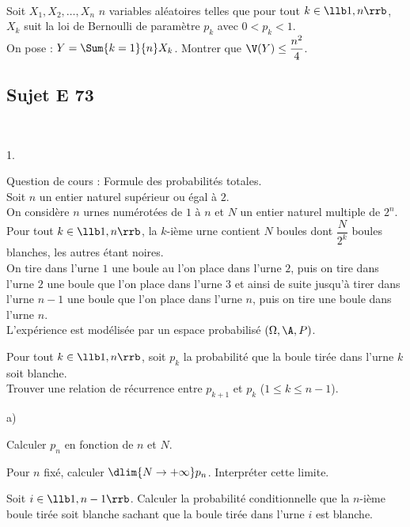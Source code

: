 \documentclass[11pt]{article}%
\begin{document}

\begin{exerciceSP}~\\
  Soit $X_1,X_2,\hdots,X_n$ $n$ variables aléatoires telles que pour
  tout $k\in\llb 1,n\rrb$, $X_k$ suit la loi de Bernoulli de paramètre
  $p_k$ avec $0 < p_k < 1$.\\
  On pose : $Y = \Sum{k=1}{n} X_k$. Montrer que $\V(Y)\leq
  \dfrac{n^2}{4}$.
\end{exerciceSP}


\newpage

\subsection*{Sujet E 73}


\begin{exerciceAP}~
  \begin{noliste}{1.}
    \setlength{\itemsep}{2mm}
  \item Question de cours : Formule des probabilités totales.\\
    Soit $n$ un entier naturel supérieur ou égal à $2$.\\
    On considère $n$ urnes numérotées de $1$ à $n$ et $N$ un entier
    naturel multiple de $2^n$.\\
    Pour tout $k\in\llb 1,n\rrb$, la $k$-ième urne contient $N$ boules
    dont $\dfrac{N}{2^k}$ boules blanches, les autres étant noires.\\
    On tire dans l'urne $1$ une boule au l'on place dans l'urne $2$,
    puis on tire dans l'urne $2$ une boule que l'on place dans l'urne
    $3$ et ainsi de suite jusqu'à tirer dans l'urne $n-1$ une boule
    que l'on place dans l'urne $n$, puis on tire une boule dans l'urne
    $n$.\\
    L'expérience est modélisée par un espace probabilisé
    $(\Omega,\A,P)$.
  \item Pour tout $k\in\llb 1,n\rrb$, soit $p_k$ la probabilité que la
    boule tirée dans l'urne $k$ soit blanche.\\
    Trouver une relation de récurrence entre $p_{k+1}$ et $p_k$
    ($1\leq k\leq n-1$).
  \item 
    \begin{noliste}{a)}
    \setlength{\itemsep}{2mm}
    \item Calculer $p_n$ en fonction de $n$ et $N$.
    \item Pour $n$ fixé, calculer $\dlim{N\to+\infty}
      p_n$. Interpréter cette limite.
    \end{noliste}
  \item Soit $i\in\llb 1,n-1\rrb$. Calculer la probabilité
    conditionnelle que la $n$-ième boule tirée soit blanche sachant
    que la boule tirée dans l'urne $i$ est blanche.
  \end{noliste}
\end{exerciceAP}
\end{document}
